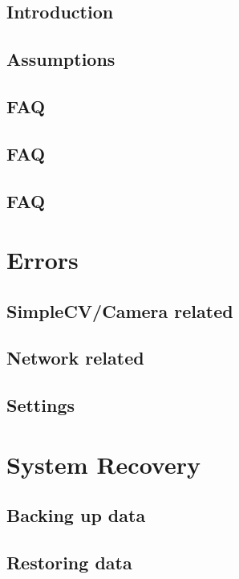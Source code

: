 \documentclass[a4paper]{article}
\begin{document}
    \subsection{Introduction}
    \subsection{Assumptions}
    \subsection{FAQ}
    \subsection{FAQ}
    \subsection{FAQ}
\section{Errors}
    \subsection{SimpleCV/Camera related}
    \subsection{Network related}
    \subsection{Settings}
\section{System Recovery}
    \subsection{Backing up data}
    \subsection{Restoring data}
\end{document}
